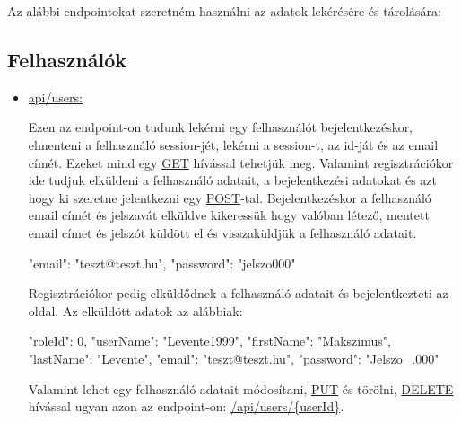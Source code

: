 
Az alábbi endpointokat szeretném használni az adatok lekérésére és tárolására:
\subsection{Felhasználók}
\begin{itemize}[label={$\bullet$}, topsep=0pt, itemsep=0pt, leftmargin=15pt]
    \item[] {\url{api/users:}}
          \begin{addmargin}[\parindent]{0pt}
              Ezen az endpoint-on tudunk lekérni egy felhasználót bejelentkezéskor, elmenteni a felhasználó session-jét, lekérni a session-t, az id-ját és az email címét. Ezeket mind egy \url{GET} hívással tehetjük meg. Valamint regisztrációkor ide tudjuk elküldeni a felhasználó adatait, a bejelentkezési adatokat és azt hogy ki szeretne jelentkezni egy \url{POST}-tal. Bejelentkezéskor a felhasználó email címét és jelszavát elküldve kikeressük hogy valóban létező, mentett email címet és jelszót küldött el és visszaküldjük a felhasználó adatait.
              \begin{json}
                  {
                      "email": "teszt@teszt.hu",
                      "password": "jelszo000"
                  }
              \end{json}

              Regisztrációkor pedig elküldődnek a felhasználó adatait és bejelentkezteti az oldal. Az elküldött adatok az alábbiak:

              \begin{json}
                  {
                      "roleId": 0,
                      "userName": "Levente1999",
                      "firstName": "Makszimus",
                      "lastName": "Levente",
                      "email": "teszt@teszt.hu",
                      "password": "Jelszo_.000"
                  }
              \end{json}

              Valamint lehet egy felhasználó adatait módosítani, \url{PUT} és törölni, \url{DELETE} hívással ugyan azon az endpoint-on: \url{/api/users/{userId}}.
          \end{addmargin}
\end{itemize}

